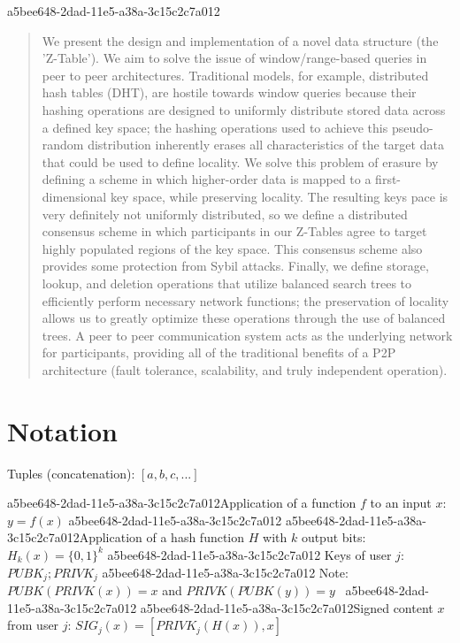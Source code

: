 \documentclass[12pt]{article}
\begin{document}
\maketitle
a5bee648-2dad-11e5-a38a-3c15c2c7a012
\begin{abstract}
We present the design and implementation of a novel data structure (the 'Z-Table'). We aim to solve the issue of window/range-based queries in peer to peer architectures. Traditional models, for example,  distributed hash tables (DHT), are hostile towards window queries because their hashing operations are designed to uniformly distribute stored data across a defined key space; the hashing operations used to achieve this pseudo-random distribution inherently erases all characteristics of the target data that could be used to define locality. We solve this problem of erasure by defining a scheme in which higher-order data is mapped to a first-dimensional key space, while preserving locality. The resulting keys pace is very definitely not uniformly distributed, so we define a distributed consensus scheme in which participants in our Z-Tables agree to target highly populated regions of the key space. This consensus scheme also provides some protection from Sybil attacks. Finally, we define storage, lookup, and deletion operations that utilize balanced search trees to efficiently perform necessary network functions; the preservation of locality allows us to greatly optimize these operations through the use of balanced trees. A peer to peer communication system acts as the underlying network for participants, providing all of the traditional benefits of a P2P architecture (fault tolerance, scalability, and truly independent operation).
\end{abstract}

\section{Notation}

Tuples (concatenation): $[a,b,c,...]$

a5bee648-2dad-11e5-a38a-3c15c2c7a012Application of a function $f$ to an input $x$: $y=f(x)$
a5bee648-2dad-11e5-a38a-3c15c2c7a012
a5bee648-2dad-11e5-a38a-3c15c2c7a012Application of a hash function $H$ with $k$ output bits: $H_{k}(x) = \{0,1\}^k$
a5bee648-2dad-11e5-a38a-3c15c2c7a012
Keys of user $j$: $ PUBK_j; PRIVK_j $
a5bee648-2dad-11e5-a38a-3c15c2c7a012
Note: $PUBK(PRIVK(x)) = x$ and $PRIVK(PUBK(y)) = y$~
a5bee648-2dad-11e5-a38a-3c15c2c7a012
a5bee648-2dad-11e5-a38a-3c15c2c7a012Signed content $x$ from user $j$: $SIG_j(x) = \left[ PRIVK_j( H(x) ), x \right]$
\end{document}
